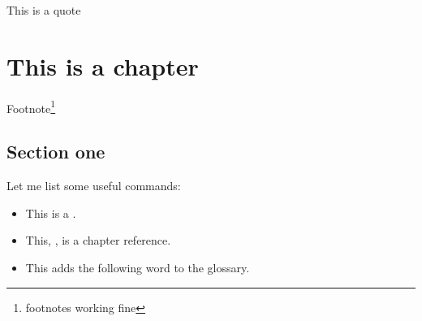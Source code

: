 
\begin{savequote}[75mm]
This is a quote
\end{savequote}

\chapter{This is a chapter}\label{ch:chapter_reference}

	Footnote\footnote{footnotes working fine}

	\lipsum[1-2]
	
	\newpage
	
	\section{Section one}\label{sec:section_one_reference}
	
		Let me list some useful commands:
		\begin{itemize}
			\item This is a .
			\item This, , is a chapter reference.
			\item This adds the following \gls{word} to the glossary.
		\end{itemize}
		
	
	
